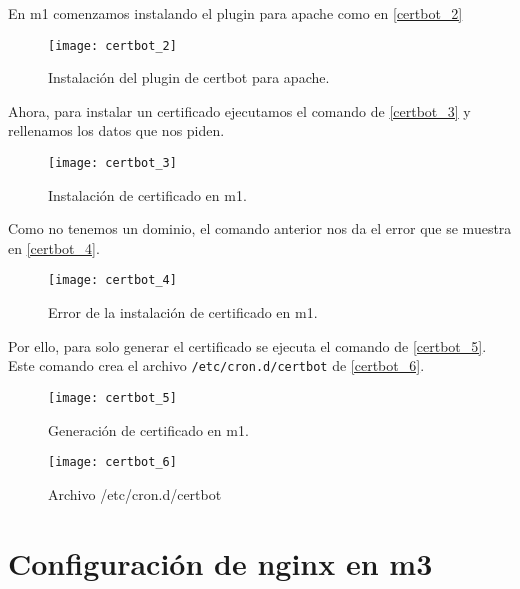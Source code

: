 En m1 comenzamos instalando el plugin para apache como en \eqref{certbot_2}

\begin{figure}[h!]
\begin{center}
\caption{Instalación del plugin de certbot para apache.}
\label{certbot_2}
\texttt{[image: certbot\_2]}
\end{center}
\end{figure}

Ahora, para instalar un certificado ejecutamos el comando de \eqref{certbot_3} y rellenamos los datos que nos piden.

\begin{figure}[h!]
\begin{center}
\caption{Instalación de certificado en m1.}
\label{certbot_3}
\texttt{[image: certbot\_3]}
\end{center}
\end{figure}

Como no tenemos un dominio, el comando anterior nos da el error que se muestra en \eqref{certbot_4}.

\begin{figure}[h!]
\begin{center}
\caption{Error de la instalación de certificado en m1.}
\label{certbot_4}
\texttt{[image: certbot\_4]}
\end{center}
\end{figure}

Por ello, para solo generar el certificado se ejecuta el comando de \eqref{certbot_5}. Este comando crea el archivo \verb|/etc/cron.d/certbot| de \eqref{certbot_6}.

\begin{figure}[h!]
\begin{center}
\caption{Generación de certificado en m1.}
\label{certbot_5}
\texttt{[image: certbot\_5]}
\end{center}
\end{figure}

\begin{figure}[h!]
\begin{center}
\caption{Archivo /etc/cron.d/certbot}
\label{certbot_6}
\texttt{[image: certbot\_6]}
\end{center}
\end{figure}

\section{Configuración de nginx en m3}

